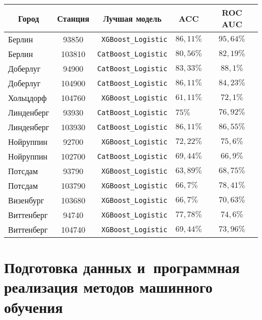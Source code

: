 \begin{multicols}{2}
\begin{table*}[b]
\begin{center}
\begin{tabular}{|l|c|r|l|c|}
\hline
\multicolumn{1}{|c|}{{\bf Город} }& 
\multicolumn{1}{c|}{{\bf Станция}} & 
\multicolumn{1}{c|}{{\bf Лучшая модель}} & 
\multicolumn{1}{c|}{{\bf ACC}}& \multicolumn{1}{c|}{{\bf ROC AUC}} \\
\hline
      Берлин &   \hphantom{9}93850 &   \verb"XGBoost_Logistic" &  $86{,}11\%$ &  $95{,}64\%$ \\
      Берлин &  103810 &  \verb"CatBoost_Logistic" &  $80{,}56\%$ &  $82{,}19\%$ \\
    Доберлуг &   \hphantom{9}94900 &  \verb"CatBoost_Logistic" &  $83{,}33\%$ &  $88{,}1\%$\hphantom{9} \\
    Доберлуг &  104900 &  \verb"CatBoost_Logistic" &  $86{,}11\%$ & $ 84{,}23\%$ \\
    Хольцдорф&  104760 &   \verb"XGBoost_Logistic" &  $61{,}11\%$ &  $72{,}1\%$\hphantom{9} \\
  Линденберг &   \hphantom{9}93930 &  \verb"CatBoost_Logistic" &  $75\%$ &  $76{,}92\%$ \\
  Линденберг &  103930 &  \verb"CatBoost_Logistic" &  $86{,}11\%$ &  $86{,}55\%$ \\
   Нойруппин &   \hphantom{9}92700 &   \verb"XGBoost_Logistic" &  $72{,}22\%$ & $ 75{,}6\%$\hphantom{9} \\
   Нойруппин &  102700 &  \verb"CatBoost_Logistic" &  $69{,}44\%$ &  $66{,}9\%$\hphantom{9} \\
     Потсдам &   \hphantom{9}93790 &   \verb"XGBoost_Logistic" &  $63{,}89\%$ &  $68{,}75\%$ \\
     Потсдам &  103790 &   \verb"XGBoost_Logistic" &  $66{,}7\%$ &  $78{,}41\%$ \\
  Визенбург &  103680 &   \verb"XGBoost_Logistic" & $66{,}7\%$ &  $70{,}63\%$ \\
  Виттенберг &   \hphantom{9}94740 &   \verb"XGBoost_Logistic" &  $77{,}78\%$ &  $74{,}6\%$\hphantom{9} \\
  Виттенберг &  104740 &   \verb"XGBoost_Logistic" &  $69{,}44\%$ &  $73{,}96\%$ \\
\hline
\end{tabular}
\end{center}
\end{table*}

\section{Подготовка данных и~программная реализация методов машинного обучения}


\end{multicols}
